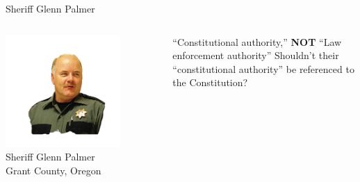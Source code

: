 \begin{frame}{Sheriff Glenn Palmer}
    \begin{columns}[onlytextwidth]
            \centering
            \includegraphics[width=0.75\textwidth]{img/glenn-palmer.png}
            \\ Sheriff Glenn Palmer
            \\ Grant County, Oregon

            { \Large
                ``Constitutional authority,'' \textbf{NOT} ``Law enforcement authority''
                \pause
                Shouldn't their ``constitutional authority'' be referenced to the Constitution?
            }
    \end{columns}
\end{frame}


